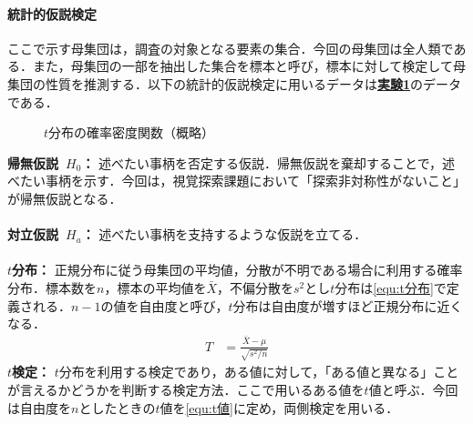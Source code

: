 \paragraph{統計的仮説検定}
ここで示す母集団は，調査の対象となる要素の集合．今回の母集団は全人類である．また，母集団の一部を抽出した集合を標本と呼び，標本に対して検定して母集団の性質を推測する．以下の統計的仮説検定に用いるデータは\textbf{\underline{実験1}}のデータである．
\begin{oframed}
    \begin{figure}
        \centering
        \caption{\(t\)分布の確率密度関数（概略）}
        \vspace{-.5cm}
    \end{figure}
    \noindent\textbf{帰無仮説\ \(H_0\)：} 述べたい事柄を否定する仮説．帰無仮説を棄却することで，述べたい事柄を示す．今回は，視覚探索課題において「探索非対称性がないこと」が帰無仮説となる．\\ \\
    \textbf{対立仮説\ \(H_a\)：} 述べたい事柄を支持するような仮説を立てる．\\ \\
    \textbf{\(t\)分布：} 正規分布に従う母集団の平均値，分散が不明である場合に利用する確率分布．標本数を\(n\)，標本の平均値を\(\bar{X}\)，不偏分散を\(s^2\)とし\(t\)分布は\eqref{equ:t分布}で定義される．\(n-1\)の値を自由度と呼び，\(t\)分布は自由度が増すほど正規分布に近くなる\cite[p.178\ -\ p.179]{応用解析と情報数学}．
    \begin{align}
        T & =\frac{\bar{X}-\mu}{\sqrt{s^2/n}}\label{equ:t分布}
    \end{align}
    \textbf{\(t\)検定：} \(t\)分布を利用する検定であり，ある値に対して，「ある値と異なる」ことが言えるかどうかを判断する検定方法．ここで用いるある値を\(t\)値と呼ぶ．今回は自由度を\(n\)としたときの\(t\)値を\eqref{equ:t値}に定め，両側検定を用いる．

\end{oframed}
